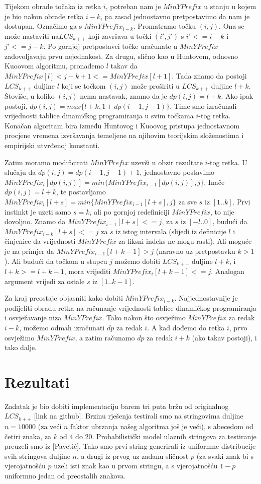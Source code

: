 \documentclass[times, utf8, seminar, numeric]{fer}
\begin{document}
Tijekom obrade točaka iz retka $i$, potreban nam je $MinYPrefix$ u
stanju u kojem je bio nakon obrade retka $i-k$, pa zasad
jednostavno pretpostavimo da nam je dostupan. Označimo ga s
$MinYPrefix_{i-k}$. Promatramo točku $(i, j)$. Ona se može
nastaviti na$ LCS_{k++}$ koji završava u točki $(i', j')$ s $i' <=
i - k$ i $j' <= j - k$. Po gornjoj pretpostavci točke uračunate u
$MinYPrefix$ zadovoljavaju prvu nejednakost. Za drugu, slično kao
u Huntovom, odnosno Kuoovom algoritmu, pronađemo $l$ takav da
$MinYPrefix[l] < j - k + 1 <= MinYPrefix[l+1]$. Tada znamo da
postoji $LCS_{k++}$ duljine $l$ koji se točkom $(i, j)$ može
proširiti u $LCS_{k++}$ duljine $l+k$. Štoviše, u koliko $(i, j)$
nema nastavak, znamo da je $dp(i, j) = l+k$.  Ako ipak postoji,
$dp(i, j) = max\{l+k, 1+dp(i-1, j-1)\}$. Time smo izračunali
vrijednosti tablice dinamičkog programiranja u svim točkama
$i$-tog retka. Konačan algoritam bira između Huntovog i Kuoovog
pristupa jednostavnom procjene vremena izvršavanja temeljene na
njihovim teorijskim složenostima i empirijski utvrđenoj konstanti.

Zatim moramo modificirati $MinYPrefix$ uzevši u obzir rezultate
$i$-tog retka. U slučaju da $dp(i, j) = dp(i-1,j-1)+1$,
jednostavno postavimo $MinYPrefix_i[dp(i,j)] =
min\{MinYPrefix_{i-1}[dp(i,j)], j\}$.  Inače $dp(i, j) = l+k$, te
postavljamo $MinYPrefix_i[l+s] = min\{MinYPrefix_{i-1}[l+s], j\}$
za sve $s$ iz $[1..k]$. Prvi instinkt je uzeti samo $s = k$, ali
po gornjoj redefiniciji $MinYPrefix$, to nije dovoljno. Znamo da
$MinYPrefix_{i-1}[l+s] <= j$, za $s$ iz $[-l..0]$, budući da
$MinYPrefix_{i-k}[l+s] <= j$ za $s$ iz istog intervala (slijedi iz
definicije $l$ i činjenice da vrijednosti $MinYPrefix$ za fiksni
indeks ne mogu rasti). Ali moguće je na primjer da
$MinYPrefix_{i-1}[l+k-1] > j$ (naravno uz pretpostavku $k > 1$).
Ali budući da točkom u stupcu $j$ možemo dobiti $LCS_{k++}$ duljine
$l+k$, i $l+k >= l+k-1$, mora vrijediti $MinYPrefix_i[l+k-1] <= j$.
Analogan argument vrijedi za ostale $s$ iz $[1..k-1]$.

Za kraj preostaje objasniti kako dobiti $MinYPrefix_{i-k}$.
Najjednostavnije je podijeliti obradu retka na računanje
vrijednosti tablice dinamičkog programiranja i osvježavanje niza
$MinYPrefix$. Tako nakon što osvježimo $MinYPrefix$ za redak
$i-k$, možemo odmah izračunati $dp$ za redak $i$. A kad dođemo do
retka $i$, prvo osvježimo $MinYPrefix$, a zatim računamo $dp$ za
redak $i+k$ (ako takav postoji), i tako dalje.

\chapter{Rezultati}
Zadatak je bio dobiti implementaciju barem tri puta bržu od
originalnog $LCS_{k++}$ [link na github]. Brzinu rješenja testirali
smo na stringovima duljine $n = 10000$ (za veći $n$ faktor ubrzanja
našeg algoritma još je veći), s abecedom od četiri znaka, za $k$ od
$4$ do $20$. Probabilistički model ulaznih stringova za testiranje
preuzeli smo iz [Pavetić]. Tako smo prvi string generirali iz
uniformne distribucije svih stringova duljine $n$, a drugi iz prvog
uz zadanu sličnost $p$ (za svaki znak bi s vjerojatnošću $p$ uzeli
isti znak kao u prvom stringu, a s vjerojatnošću $1-p$ uniformno
jedan od preostalih znakova.
\end{document}

